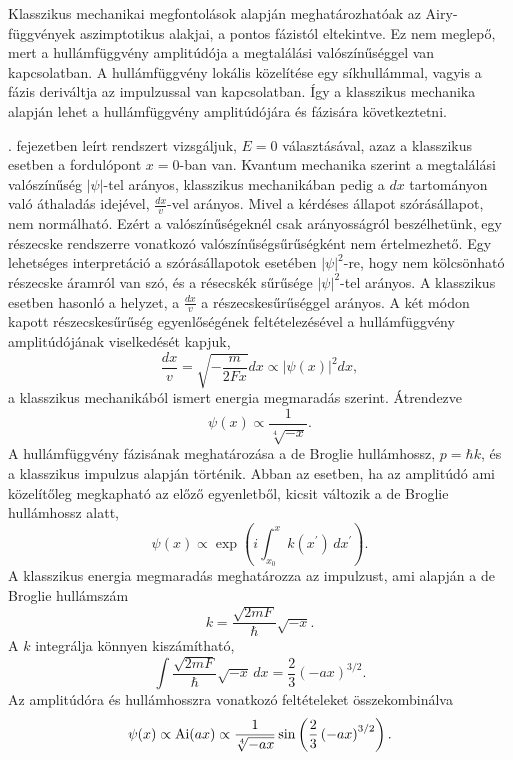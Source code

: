 Klasszikus mechanikai megfontolások alapján meghatározhatóak az Airy-függvények aszimptotikus alakjai, a pontos fázistól eltekintve. Ez nem meglepő, mert a hullámfüggvény amplitúdója a megtalálási valószínűséggel van kapcsolatban. A hullámfüggvény lokális közelítése egy síkhullámmal, vagyis a fázis deriváltja az impulzussal van kapcsolatban. Így a klasszikus mechanika alapján lehet a hullámfüggvény amplitúdójára és fázisára következtetni.

. fejezetben leírt rendszert vizsgáljuk, $E=0$ választásával, azaz a klasszikus esetben a fordulópont $x=0$-ban van. Kvantum mechanika szerint a megtalálási valószínűség $|\psi|$-tel arányos, klasszikus mechanikában pedig a $dx$ tartományon való áthaladás idejével, $\frac{dx}{v}$-vel arányos. Mivel a kérdéses állapot szórásállapot, nem normálható. Ezért a valószínűségeknél csak arányosságról beszélhetünk, egy részecske rendszerre vonatkozó valószínűségsűrűségként nem értelmezhető. Egy lehetséges interpretáció a szórásállapotok esetében $|\psi|^2$-re, hogy nem kölcsönható részecske áramról van szó, és a résecskék sűrűsége $|\psi|^2$-tel arányos. A klasszikus esetben hasonló a helyzet, a $\frac{dx}{v}$ a részecskesűrűséggel arányos. A két módon kapott részecskesűrűség egyenlőségének feltételezésével a hullámfüggvény amplitúdójának viselkedését kapjuk,
\begin{equation}
	\frac{dx}{v}=\sqrt{-\frac{m}{2Fx}}dx\propto \lvert\psi(x)\rvert^2dx,
\end{equation}
a klasszikus mechanikából ismert energia megmaradás szerint. Átrendezve
\begin{equation}
	\psi(x)\propto\frac{1}{\sqrt[4]{-x}}.
\end{equation}
A hullámfüggvény fázisának meghatározása a de Broglie hullámhossz, $p=\hbar k$, és a klasszikus impulzus alapján történik. Abban az esetben, ha az amplitúdó ami közelítőleg megkapható az előző egyenletből, kicsit változik a de Broglie hullámhossz alatt,
\begin{equation}
	\psi(x)\propto\exp\left(i\int_{x_0}^xk\left(x^\prime\right)\,dx^\prime\right).
\end{equation}
A klasszikus energia megmaradás meghatározza az impulzust, ami alapján a de Broglie hullámszám
\begin{equation}
	k=\frac{\sqrt{2mF}}{\hbar}\sqrt{-x}.
\end{equation}
A $k$ integrálja könnyen kiszámítható,
\begin{equation}
	\int \frac{\sqrt{2mF}}{\hbar}\sqrt{-x}\,dx=\frac{2}{3}\left(-ax\right)^{3/2}.
\end{equation}
Az amplitúdóra és hullámhosszra vonatkozó feltételeket összekombinálva
\begin{equation}
	\psi(x)\propto\operatorname{Ai}(ax)\propto\frac{1}{\sqrt[4]{-ax}}\sin\left(\frac{2}{3}\left(-ax\right)^{3/2}\right).
\end{equation}





